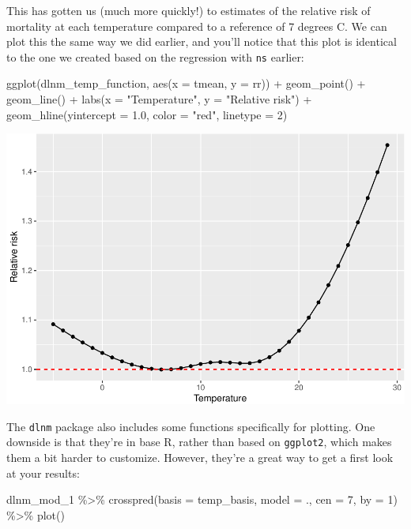 \documentclass[
]{book}
\newenvironment{Shaded}{\begin{snugshade}}{\end{snugshade}}
\newcommand{\AttributeTok}[1]{\textcolor[rgb]{0.77,0.63,0.00}{#1}}
\newcommand{\DecValTok}[1]{\textcolor[rgb]{0.00,0.00,0.81}{#1}}
\newcommand{\FloatTok}[1]{\textcolor[rgb]{0.00,0.00,0.81}{#1}}
\newcommand{\FunctionTok}[1]{\textcolor[rgb]{0.00,0.00,0.00}{#1}}
\newcommand{\NormalTok}[1]{#1}
\newcommand{\SpecialCharTok}[1]{\textcolor[rgb]{0.00,0.00,0.00}{#1}}
\newcommand{\StringTok}[1]{\textcolor[rgb]{0.31,0.60,0.02}{#1}}
\begin{document}
This has gotten us (much more quickly!) to estimates of the relative risk of mortality at
each temperature compared to a reference of 7 degrees C. We can plot this the same way we
did earlier, and you'll notice that this plot is identical to the one we created based on the
regression with \texttt{ns} earlier:

\begin{Shaded}
\begin{Highlighting}[]
\FunctionTok{ggplot}\NormalTok{(dlnm\_temp\_function, }\FunctionTok{aes}\NormalTok{(}\AttributeTok{x =}\NormalTok{ tmean, }\AttributeTok{y =}\NormalTok{ rr)) }\SpecialCharTok{+} 
  \FunctionTok{geom\_point}\NormalTok{() }\SpecialCharTok{+} 
  \FunctionTok{geom\_line}\NormalTok{() }\SpecialCharTok{+} 
  \FunctionTok{labs}\NormalTok{(}\AttributeTok{x =} \StringTok{"Temperature"}\NormalTok{, }\AttributeTok{y =} \StringTok{"Relative risk"}\NormalTok{) }\SpecialCharTok{+} 
  \FunctionTok{geom\_hline}\NormalTok{(}\AttributeTok{yintercept =} \FloatTok{1.0}\NormalTok{, }\AttributeTok{color =} \StringTok{"red"}\NormalTok{, }\AttributeTok{linetype =} \DecValTok{2}\NormalTok{)}
\end{Highlighting}
\end{Shaded}

\includegraphics{adv_epi_analysis_files/figure-latex/unnamed-chunk-82-1.pdf}

The \texttt{dlnm} package also includes some functions specifically for plotting. One downside
is that they're in base R, rather than based on \texttt{ggplot2}, which makes them a bit
harder to customize. However, they're a great way to get a first look at your results:

\begin{Shaded}
\begin{Highlighting}[]
\NormalTok{dlnm\_mod\_1 }\SpecialCharTok{\%\textgreater{}\%} 
  \FunctionTok{crosspred}\NormalTok{(}\AttributeTok{basis =}\NormalTok{ temp\_basis, }\AttributeTok{model =}\NormalTok{ ., }\AttributeTok{cen =} \DecValTok{7}\NormalTok{, }\AttributeTok{by =} \DecValTok{1}\NormalTok{) }\SpecialCharTok{\%\textgreater{}\%} 
  \FunctionTok{plot}\NormalTok{()}
\end{Highlighting}
\end{Shaded}
\end{document}
